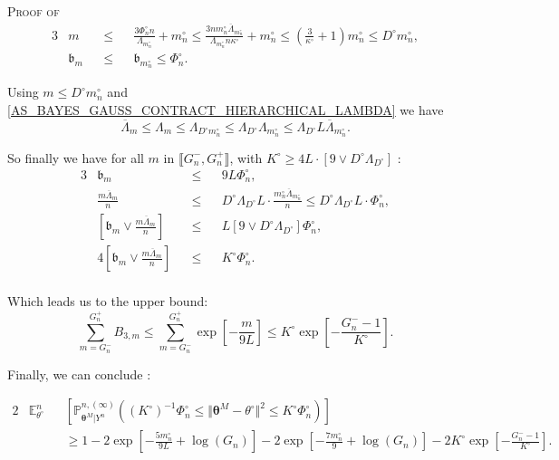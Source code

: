 \begin{pro}{\textsc{Proof of } \\}
\begin{alignat*}{3}
& m && \leq && \frac{3 \Phi_{n}^{\circ} n}{\Lambda_{m_{n}^{\circ}}} + m_{n}^{\circ} \leq \frac{3 n m_{n}^{\circ} \overline{\Lambda}_{m_{n}^{\circ}}}{\Lambda_{m_{n}^{\circ}} n \kappa^{\circ}} + m_{n}^{\circ} \leq \left(\frac{3}{\kappa^{\circ}} + 1\right) m_{n}^{\circ} \leq D^{\circ} m_{n}^{\circ},\\ 
& \mathfrak{b}_{m} && \leq && \mathfrak{b}_{m_{n}^{\circ}} \leq \Phi_{n}^{\circ}.
\end{alignat*}

Using $m \leq D^{\circ} m_{n}^{\circ}$ and \textsc{\cref{AS_BAYES_GAUSS_CONTRACT_HIERARCHICAL_LAMBDA}} we have
\[\overline{\Lambda}_{m} \leq \Lambda_{m} \leq \Lambda_{D^{\circ} m_{n}^{\circ}} \leq \Lambda_{D^{\circ}} \Lambda_{m_{n}^{\circ}} \leq \Lambda_{D^{\circ}} L \overline{\Lambda}_{m_{n}^{\circ}}.\]

So finally we have for all $m$ in $\llbracket G_{n}^{-}, G_{n}^{+}\rrbracket$, with $K^{\circ} \geq 4L \cdot \left[9 \vee D^{\circ} \Lambda_{D^{\circ}}\right]$ :
\begin{alignat*}{3}
& \mathfrak{b}_{m} && \leq && 9 L \Phi_{n}^{\circ},\\
& \frac{m \overline{\Lambda}_{m}}{n} && \leq && D^{\circ} \Lambda_{D^{\circ}} L \cdot \frac{m_{n}^{\circ} \overline{\Lambda}_{m_{n}^{\circ}}}{n} \leq D^{\circ} \Lambda_{D^{\circ}} L \cdot \Phi_{n}^{\circ},\\
& \left[\mathfrak{b}_{m} \vee \frac{m \overline{\Lambda}_{m}}{n}\right] && \leq && L \left[9 \vee D^{\circ} \Lambda_{D^{\circ}}\right] \Phi_{n}^{\circ},\\
& 4 \left[\mathfrak{b}_{m} \vee \frac{m \overline{\Lambda}_{m}}{n}\right] && \leq && K^{\circ} \Phi_{n}^{\circ}.\\
\end{alignat*}

Which leads us to the upper bound:
\[\sum\limits_{m = G_{n}^{-}}^{G_{n}^{+}}B_{3, m} \leq \sum\limits_{m = G_{n}^{-}}^{G_{n}^{+}} \exp\left[- \frac{m}{9 L}\right] \leq K^{\circ} \exp\left[-\frac{G_{n}^{-} - 1}{K^{\circ}}\right].\]

\bigskip

Finally, we can conclude :

\begin{alignat*}{2}
& \mathds{E}_{\theta^{\circ}}^{n} && \left[\mathds{P}_{\boldsymbol{\theta}^{M}\vert Y^{n}}^{n, (\infty)}\left(\left(K^{\circ}\right)^{-1}\Phi_{n}^{\circ} \leq \Vert \boldsymbol{\theta}^{M} - \theta^{\circ} \Vert ^{2} \leq K^{\circ} \Phi_{n}^{\circ}\right)\right]\\
& && \geq 1 - 2 \exp\left[- \frac{5 m_{n}^{\circ}}{9 L} + \log\left(G_{n}\right)\right] - 2 \exp\left[- \frac{7 m_{n}^{\circ}}{9} + \log\left(G_{n}\right)\right] - 2 K^{\circ} \exp\left[- \frac{G_{n}^{-} - 1}{K^{\circ}}\right].
\end{alignat*}
\end{pro}